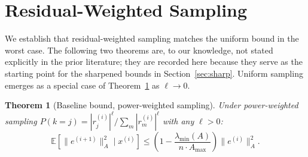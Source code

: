 \documentclass[pdflatex,sn-mathphys-num]{sn-jnl}%
\newcommand{\E}{\mathbb{E}}
\newcommand{\Anorm}[1]{\|#1\|_{A}}
\newcommand{\lmin}{\lambda_{\min}}
\theoremstyle{thmstyleone}%
\newtheorem{theorem}{Theorem}%
\theoremstyle{thmstyletwo}%
\theoremstyle{thmstylethree}%
\begin{document}
\section{Residual-Weighted Sampling}
\label{sect:baseline-residual-weighted}

We establish that residual-weighted sampling matches the uniform bound in the worst case. The following two theorems are, to our knowledge, not stated explicitly in the prior literature; they are recorded here because they serve as the starting point for the sharpened bounds in Section~\ref{sec:sharp}. Uniform sampling emerges as a special case of Theorem~\ref{thm:baseline-power} as $\ell \to 0$.

\begin{theorem}[Baseline bound, power-weighted sampling]
\label{thm:baseline-power}
Under power-weighted sampling $P(k=j) = |r_j^{(i)}|^\ell / \sum_m |r_m^{(i)}|^\ell$
with any $\ell > 0$:
$$
\E[\Anorm{e^{(i+1)}}^2 \mid x^{(i)}] \leq \left(1 - \frac{\lmin(A)}{n \cdot A_{\max}}\right) \Anorm{e^{(i)}}^2.
$$
\end{theorem}
\end{document}
